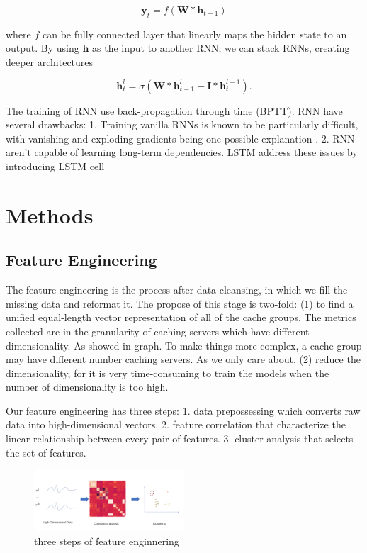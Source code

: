 \documentclass[5p]{elsarticle}
\begin{document}
\begin{equation}
	\mathbf y_t = f(\mathbf W * \mathbf h_{t-1})
\end{equation}

where $f$ can be fully connected layer that linearly maps the hidden state to an output. By using $\mathbf h$ as the input to another RNN, we can stack RNNs, creating deeper architectures 

\begin{equation}
	\mathbf h_t^{l} = \sigma(\mathbf W * \mathbf h_{t-1}^{l} + \mathbf I * \mathbf h_t^{l-1}).
\end{equation}

The training of RNN use back-propagation through time (BPTT). RNN have several drawbacks: 1. Training vanilla RNNs is known to be particularly difficult, with vanishing and exploding gradients being one possible explanation \cite{Bengio1994LearningDifficult}. 2. RNN aren't capable of learning long-term dependencies. LSTM address these issues by introducing LSTM cell\cite{Hochreiter1997LongMemory} 


\section{Methods}
\subsection{Feature Engineering}
The feature engineering is the process after data-cleansing, in which we fill the missing data and reformat it. The propose of this stage is two-fold:
(1) to find a unified equal-length vector representation of all of the cache groups. 
The metrics collected are in the granularity of caching servers which have different dimensionality. As showed in graph. To make things more complex, a cache group may have different number caching servers. As we only care about. 
(2) reduce the dimensionality, for it is very time-consuming to train the models when the number of dimensionality is too high.

Our feature engineering has three steps: 1. data prepossessing which converts raw data into high-dimensional vectors. 2. feature correlation that characterize the linear relationship between every pair of features. 3. cluster analysis that selects the set of features.

\begin{figure}[h]
    \centering
    \includegraphics[width=0.5\textwidth]{feature_engineering.png}
    \caption{three steps of feature enginnering}
    \label{fig:Correlation_matrix}
\end{figure}
\end{document}
